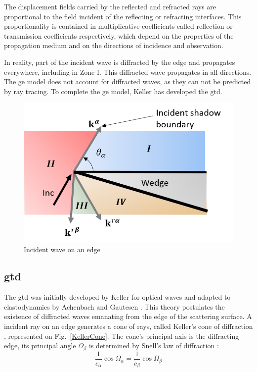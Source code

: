 The displacement fields carried by the reflected and refracted rays are proportional to the field incident of the reflecting or refracting interfaces. This proportionality is contained in multiplicative coefficients called reflection or transmission coefficients respectively, which depend on the properties of the propagation medium and on the directions of incidence and observation.

In reality, part of the incident wave is diffracted by the edge and propagates everywhere, including in Zone I. This diffracted wave propagates in all directions. The \acrshort{ge} model does not account for diffracted waves, as they can not be predicted by ray tracing. To complete the \acrshort{ge} model, Keller \cite{GTD} has developed the \acrfull{gtd}.

\begin{figure}
    \centering
    \includegraphics[height=0.33\textheight]{images/chapter1/ShadowBoundary.png}
    \caption{Incident wave on an edge}
    \label{illuzones}
\end{figure}

\subsection{\acrfull{gtd}}
\label{C1:GTD}
The \acrfull{gtd} was initially developed by Keller \cite{GTD} for optical waves and adapted to elastodynamics by Achenbach and Gautesen \cite{AchenbachGautesen, Achenbach}. This theory postulates the existence of diffracted waves emanating from the edge of the scattering surface. A incident ray on an edge generates a cone of rays, called Keller's cone of diffraction \cite{GTD}, represented on Fig.~\ref{KellerCone}. The cone's principal axis is the diffracting edge, its principal angle $\Omega_{\beta}$ is determined by Snell's law of diffraction :
\begin{equation}
    \frac{1}{c_{\alpha}}\cos\Omega_{\alpha} = \frac{1}{c_{\beta}} \cos\Omega_{\beta}
    \label{Snelldiff}
\end{equation}

